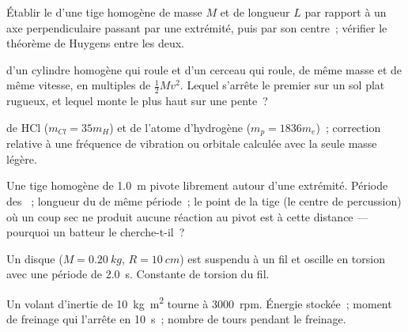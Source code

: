 \begin{exercise}[$\star$]\label{exo:b1:systems-of-points:4}
Établir le  d'une tige homogène de masse $M$ et de
longueur $L$ par rapport à un axe perpendiculaire passant par une
extrémité, puis par son centre~; vérifier le théorème de Huygens entre
les deux.
\end{exercise}

\begin{exercise}[$\star\star$]\label{exo:b1:systems-of-points:5}
 d'un cylindre homogène qui roule et d'un cerceau qui
roule, de même masse et de même vitesse, en multiples de $\tfrac12 Mv^2$.
Lequel s'arrête le premier sur un sol plat rugueux, et lequel monte le
plus haut sur une pente~?
\end{exercise}

\begin{exercise}[$\star\star$]\label{exo:b1:systems-of-points:6}
 de HCl ($m_{Cl} = 35m_H$) et de l'atome d'hydrogène
($m_p = 1836m_e$)~; correction relative à une fréquence de vibration ou
orbitale calculée avec la seule masse légère.
\end{exercise}

\begin{exercise}[$\star\star$]\label{exo:b1:systems-of-points:7}
Une tige homogène de \qty{1.0}{m} pivote librement autour d'une
extrémité. Période des ~; longueur du 
de même période~; le point de la tige (le centre de percussion) où un
coup sec ne produit aucune réaction au pivot est à cette distance ---
pourquoi un batteur le cherche-t-il~?
\end{exercise}

\begin{exercise}[$\star\star$]\label{exo:b1:systems-of-points:8}
Un disque ($M = \qty{0.20}{kg}$, $R = \qty{10}{cm}$) est suspendu à un fil
et oscille en torsion avec une période de \qty{2.0}{s}. Constante de
torsion du fil.
\end{exercise}

\begin{exercise}[$\star\star$]\label{exo:b1:systems-of-points:9}
Un volant d'inertie de  \qty{10}{kg.m^2} tourne à
\qty{3000}{rpm}. Énergie stockée~; moment de freinage qui l'arrête en
\qty{10}{s}~; nombre de tours pendant le freinage.
\end{exercise}

